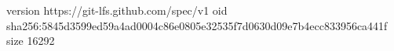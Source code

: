 version https://git-lfs.github.com/spec/v1
oid sha256:5845d3599ed59a4ad0004c86e0805e32535f7d0630d09e7b4ecc833956ca441f
size 16292
